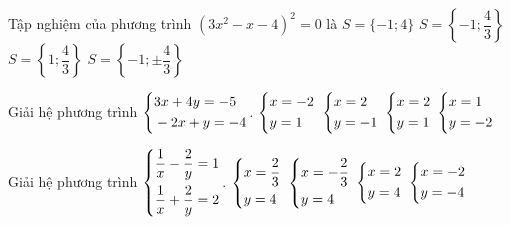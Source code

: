 \begin{ex}%
	Tập nghiệm của phương trình $(3x^2-x-4)^2=0$ là
	\choice
	{$S=\{-1;4\}$}
	{\True $S=\left\{-1;\dfrac{4}{3}\right\}$}
	{$S=\left\{1;\dfrac{4}{3}\right\}$}
	{$S=\left\{-1;\pm\dfrac{4}{3}\right\}$}
\end{ex}
\begin{ex}%
	Giải hệ phương trình $\heva{&3x+4y=-5\\&-2x+y=-4}$.
	\choice
	{$\heva{&x=-2\\&y=1}$}
	{$\heva{&x=2\\&y=-1}$}
	{$\heva{&x=2\\&y=1}$}
	{\True $\heva{&x=1\\&y=-2}$}
\end{ex}
\begin{ex}%
	Giải hệ phương trình $\heva{&\dfrac{1}{x}-\dfrac{2}{y}=1\\&\dfrac{1}{x}+\dfrac{2}{y}=2}$.
	\choice
	{\True $\heva{&x=\dfrac{2}{3}\\&y=4}$}
	{$\heva{&x=-\dfrac{2}{3}\\&y=4}$}
	{$\heva{&x=2\\&y=4}$}
	{$\heva{&x=-2\\&y=-4}$}
\end{ex}
